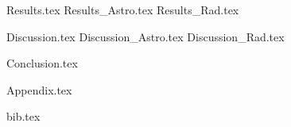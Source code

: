 \documentclass[aps,superscriptaddress,floatfix,nofootinbib,showpacs,amsmath,amssymb,altaffilletter,floatfix,onecolumn]{revtex4-1}
\begin{document}
{Results.tex} 
{Results_Astro.tex} 
{Results_Rad.tex} 

{Discussion.tex}
{Discussion_Astro.tex}
{Discussion_Rad.tex}

{Conclusion.tex} 
\newpage

{Appendix.tex}
\newpage

{bib.tex}%

\clearpage

\end{document}
